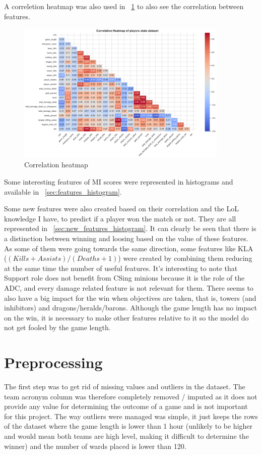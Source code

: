 \documentclass[12pt, a4paper]{article}
\begin{document}
A correletion heatmap was also used in \figurename~\ref{fig:correlation_heatmap} to also see the correlation between features.

\begin{figure}[!ht]
    \centering
    \includegraphics[width=0.9\textwidth]{figures/0_visualization_features_correlation.png}
    \caption{Correlation heatmap}
    \label{fig:correlation_heatmap}
\end{figure}

Some interesting features of MI scores were represented in histograms and available in \appendixname~\ref{sec:features_histogram}.

Some new features were also created based on their correlation and the LoL knowledge I have, to predict if a player won the match or not.
They are all represented in \appendixname~\ref{sec:new_features_histogram}.
It can clearly be seen that there is a distinction between winning and loosing based on the value of these features.
As some of them were going towards the same direction, some features like KLA ($(Kills+Assists)/(Deaths+1)$) were created by combining them reducing at the same time the number of useful features.
It's interesting to note that Support role does not benefit from CSing minions because it is the role of the ADC, and every damage related feature is not relevant for them.
There seems to also have a big impact for the win when objectives are taken, that is, towers (and inhibitors) and dragons/heralds/barons.
Although the game length has no impact on the win, it is necessary to make other features relative to it so the model do not get fooled by the game length.

\section{Preprocessing}
The first step was to get rid of missing values and outliers in the dataset.
The team acronym column was therefore completely removed / imputed as it does not provide any value for determining the outcome of a game and is not important for this project.
The way outliers were managed was simple, it just keeps the rows of the dataset where the game length is lower than 1 hour (unlikely to be higher and would mean both teams are high level, making it difficult to determine the winner) and the number of wards placed is lower than 120.
\end{document}
